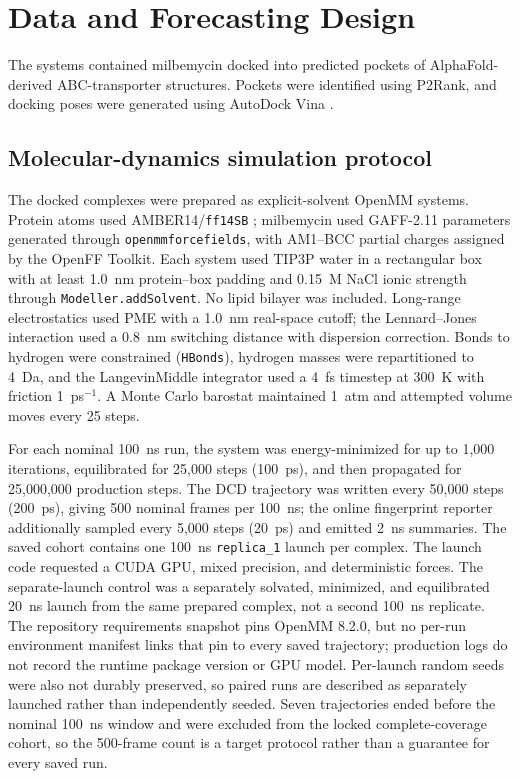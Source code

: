 \documentclass[11pt]{article}
\begin{document}
\section{Data and Forecasting Design}

The systems contained milbemycin docked into predicted pockets of AlphaFold-derived ABC-transporter structures. Pockets were identified using P2Rank, and docking poses were generated using AutoDock Vina \cite{jumper2021alphafold,mirdita2022colabfold,krivak2018p2rank,trott2010vina}.

\subsection{Molecular-dynamics simulation protocol}

The docked complexes were prepared as explicit-solvent OpenMM \cite{eastman2024openmm} systems. Protein atoms used AMBER14/\texttt{ff14SB} \cite{maier2015ff14sb}; milbemycin used GAFF-2.11 parameters \cite{wang2004gaff} generated through \texttt{openmmforcefields}, with AM1--BCC partial charges \cite{jakalian2002am1bcc} assigned by the OpenFF Toolkit. Each system used TIP3P water \cite{jorgensen1983tip3p} in a rectangular box with at least 1.0~nm protein--box padding and 0.15~M NaCl ionic strength through \texttt{Modeller.addSolvent}. No lipid bilayer was included. Long-range electrostatics used PME with a 1.0~nm real-space cutoff; the Lennard--Jones interaction used a 0.8~nm switching distance with dispersion correction. Bonds to hydrogen were constrained (\texttt{HBonds}), hydrogen masses were repartitioned to 4~Da, and the LangevinMiddle integrator used a 4~fs timestep at 300~K with friction 1~ps$^{-1}$. A Monte Carlo barostat maintained 1~atm and attempted volume moves every 25 steps.

For each nominal 100~ns run, the system was energy-minimized for up to 1,000 iterations, equilibrated for 25,000 steps (100~ps), and then propagated for 25,000,000 production steps. The DCD trajectory was written every 50,000 steps (200~ps), giving 500 nominal frames per 100~ns; the online fingerprint reporter additionally sampled every 5,000 steps (20~ps) and emitted 2~ns summaries. The saved cohort contains one 100~ns \texttt{replica\_1} launch per complex. The launch code requested a CUDA GPU, mixed precision, and deterministic forces. The separate-launch control was a separately solvated, minimized, and equilibrated 20~ns launch from the same prepared complex, not a second 100~ns replicate. The repository requirements snapshot pins OpenMM 8.2.0, but no per-run environment manifest links that pin to every saved trajectory; production logs do not record the runtime package version or GPU model. Per-launch random seeds were also not durably preserved, so paired runs are described as separately launched rather than independently seeded. Seven trajectories ended before the nominal 100~ns window and were excluded from the locked complete-coverage cohort, so the 500-frame count is a target protocol rather than a guarantee for every saved run.
\end{document}
